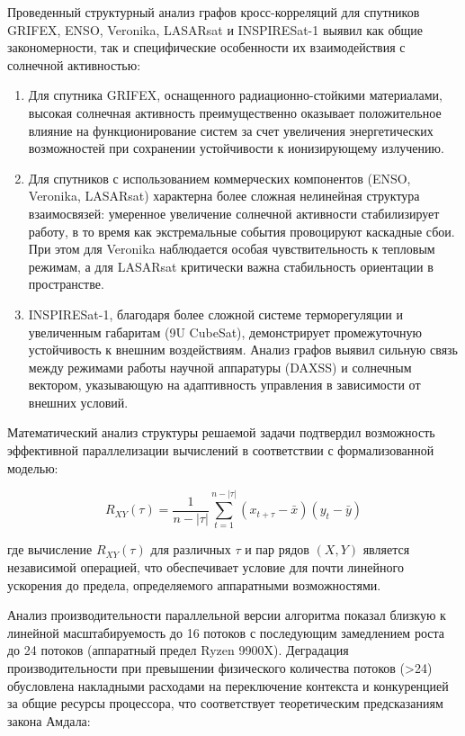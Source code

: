 Проведенный структурный анализ графов кросс-корреляций для спутников GRIFEX,
ENSO, Veronika, LASARsat и INSPIRESat-1 выявил как общие закономерности, так и
специфические особенности их взаимодействия с солнечной активностью:

\begin{enumerate}
	\item Для спутника GRIFEX, оснащенного радиационно-стойкими материалами, высокая солнечная активность преимущественно оказывает положительное влияние на функционирование систем за счет увеличения энергетических возможностей при сохранении устойчивости к ионизирующему излучению.

	\item Для спутников с использованием коммерческих компонентов (ENSO, Veronika, LASARsat) характерна более сложная нелинейная структура взаимосвязей: умеренное увеличение солнечной активности стабилизирует работу, в то время как экстремальные события провоцируют каскадные сбои. При этом для Veronika наблюдается особая чувствительность к тепловым режимам, а для LASARsat критически важна стабильность ориентации в пространстве.

	\item INSPIRESat-1, благодаря более сложной системе терморегуляции и увеличенным габаритам (9U CubeSat), демонстрирует промежуточную устойчивость к внешним воздействиям. Анализ графов выявил сильную связь между режимами работы научной аппаратуры (DAXSS) и солнечным вектором, указывающую на адаптивность управления в зависимости от внешних условий.
\end{enumerate}

\vspace{0.5cm}

Математический анализ структуры решаемой задачи подтвердил возможность
эффективной параллелизации вычислений в соответствии с формализованной моделью:

\begin{equation}
	R_{XY}(\tau) = \frac{1}{n-|\tau|} \sum_{t=1}^{n-|\tau|} (x_{t+\tau} - \bar{x})(y_t - \bar{y})
\end{equation}

где вычисление $R_{XY}(\tau)$ для различных $\tau$ и пар рядов $(X,Y)$ является
независимой операцией, что обеспечивает условие для почти линейного ускорения до
предела, определяемого аппаратными возможностями.

\vspace{0.5cm}

Анализ производительности параллельной версии алгоритма показал близкую к
линейной масштабируемость до 16 потоков с последующим замедлением роста до 24
потоков (аппаратный предел Ryzen 9900X). Деградация производительности при
превышении физического количества потоков (>24) обусловлена накладными расходами
на переключение контекста и конкуренцией за общие ресурсы процессора, что
соответствует теоретическим предсказаниям закона Амдала:

